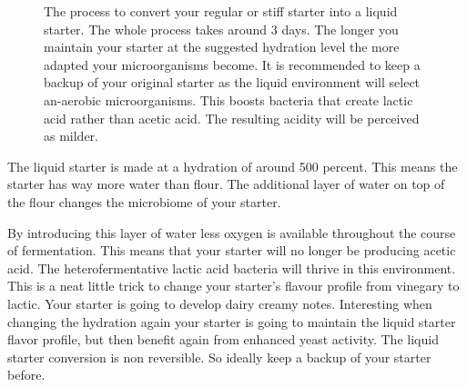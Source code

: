 \begin{figure}[!htb]
  \caption{The process to convert your regular or stiff starter into a liquid starter. The whole
  process takes around 3 days. The longer you maintain your starter at the
  suggested hydration level the more adapted your microorganisms become. It is recommended
  to keep a backup of your original starter as the liquid environment will select
  an-aerobic microorganisms. This boosts bacteria that create lactic acid rather
  than acetic acid. The resulting acidity will be perceived as milder.}
  \label{fig:liquid-starter-conversion}
\end{figure}

The liquid starter is made at a hydration of around 500 percent. This means
the starter has way more water than flour. The additional layer of water on
top of the flour changes the microbiome of your starter.

By introducing this layer of water less oxygen is available throughout the
course of fermentation. This means that your starter will no longer be
producing acetic acid. The heterofermentative lactic acid bacteria will thrive
in this environment. This is a neat little trick to change your starter's
flavour profile from vinegary to lactic. Your starter is going to develop
dairy creamy notes. Interesting when changing the hydration again your starter
is going to maintain the liquid starter flavor profile, but then benefit again
from enhanced yeast activity. The liquid starter conversion is non reversible.
So ideally keep a backup of your starter before.

